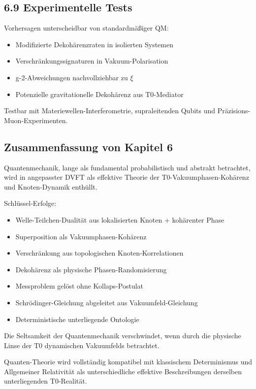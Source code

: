 \documentclass[12pt,a4paper]{article}
\begin{document}
	\subsection{6.9 Experimentelle Tests}
	
	Vorhersagen unterscheidbar von standardmäßiger QM:
	\begin{itemize}
		\item Modifizierte Dekohärenzraten in isolierten Systemen
		\item Verschränkungssignaturen in Vakuum-Polarisation
		\item g-2-Abweichungen nachvollziehbar zu $\xi$
		\item Potenzielle gravitationelle Dekohärenz aus T0-Mediator
	\end{itemize}
	
	Testbar mit Materiewellen-Interferometrie, supraleitenden Qubits und Präzisions-Muon-Experimenten.
	
	\subsection{Zusammenfassung von Kapitel 6}
	
	Quantenmechanik, lange als fundamental probabilistisch und abstrakt betrachtet, wird in angepasster DVFT als effektive Theorie der T0-Vakuumphasen-Kohärenz und Knoten-Dynamik enthüllt.
	
	Schlüssel-Erfolge:
	\begin{itemize}
		\item Welle-Teilchen-Dualität aus lokalisierten Knoten + kohärenter Phase
		\item Superposition als Vakuumphasen-Kohärenz
		\item Verschränkung aus topologischen Knoten-Korrelationen
		\item Dekohärenz als physische Phasen-Randomisierung
		\item Messproblem gelöst ohne Kollaps-Postulat
		\item Schrödinger-Gleichung abgeleitet aus Vakuumfeld-Gleichung
		\item Deterministische unterliegende Ontologie
	\end{itemize}
	
	Die Seltsamkeit der Quantenmechanik verschwindet, wenn durch die physische Linse der T0 dynamischen Vakuumfelds betrachtet.
	
	Quanten-Theorie wird vollständig kompatibel mit klassischem Determinismus und Allgemeiner Relativität als unterschiedliche effektive Beschreibungen derselben unterliegenden T0-Realität.
	
\end{document}
